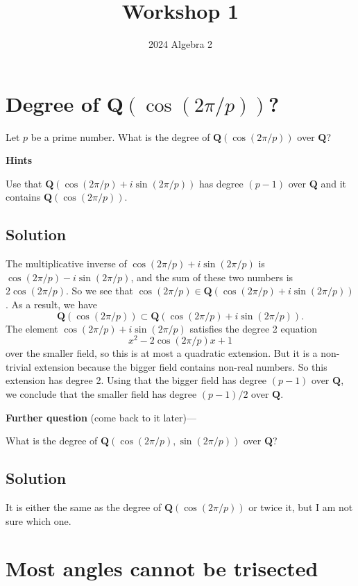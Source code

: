 \documentclass[12pt]{amsart}
\author{2024 Algebra 2}
\date{}
\title{Workshop 1}
\begin{document}
\maketitle
\section{Degree of \(\mathbf{Q}(\cos (2\pi/p))\)?}
\label{sec:org910cfd2}

\noindent
Let \(p\) be a prime number.
What is the degree of \(\mathbf{Q}(\cos (2\pi/p))\) over \(\mathbf{Q}\)?

\bigskip

\noindent
\textbf{\textbf{Hints}}

Use that \(\mathbf{Q}(\cos(2\pi/p) + i \sin(2\pi/p))\) has degree \((p-1)\) over \(\mathbf{Q}\) and it contains \(\mathbf{Q}(\cos(2\pi/p))\).
\subsection*{Solution}
\label{sec:org797ce72}
The multiplicative inverse of \(\cos(2\pi/p) + i \sin(2\pi/p)\) is \(\cos(2\pi/p) - i \sin(2\pi/p)\), and the sum of these two numbers is \(2\cos(2\pi/p)\).
So we see that \(\cos(2\pi/p) \in \mathbf{Q}(\cos(2\pi/p) + i \sin(2\pi/p))\).
As a result, we have
\[ \mathbf{Q}(\cos(2\pi/p)) \subset \mathbf{Q}(\cos(2\pi/p) + i \sin(2\pi/p)).\]
The element \(\cos(2\pi/p) + i \sin(2\pi/p)\) satisfies the degree 2 equation
\[ x^2 - 2\cos(2\pi/p)x + 1\]
over the smaller field, so this is at most a quadratic extension.
But it is a non-trivial extension because the bigger field contains non-real numbers.
So this extension has degree 2.
Using that the bigger field has degree \((p-1)\) over \(\mathbf{Q}\), we conclude that the smaller field has degree \((p-1)/2\) over \(\mathbf{Q}\).

\textbf{\textbf{Further question}} (come back to it later)---

What is the degree of \(\mathbf{Q}(\cos (2\pi/p), \sin(2\pi/p))\) over \(\mathbf{Q}\)?
\subsection*{Solution}
\label{sec:orge755005}
It is either the same as the degree of \(\mathbf{Q}(\cos (2\pi/p))\) or twice it, but I am not sure which one.
\section{Most angles cannot be trisected}
\label{sec:orgec0295a}
\end{document}
